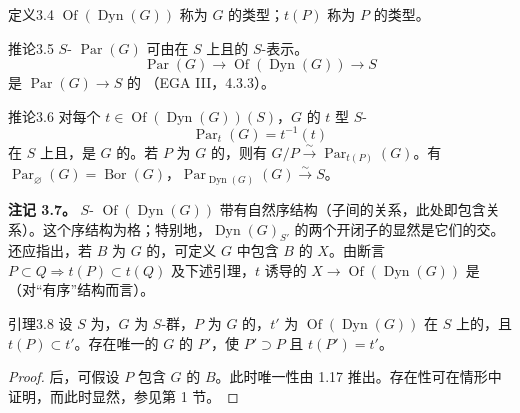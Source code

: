 \begin{SGAresult}{定义}{3.4}
$\operatorname{Of}(\operatorname{Dyn}(G))$ 称为 $G$ 的类型；$t(P)$ 称为 $P$ 的类型。
\end{SGAresult}
\begin{SGAresult}{推论}{3.5}
$S$- $\operatorname{Par}(G)$ 可由在 $S$ 上且的 $S$-表示。
\[\operatorname{Par}(G)\longrightarrow\operatorname{Of}(\operatorname{Dyn}(G))\longrightarrow S\]
是 $\operatorname{Par}(G)\to S$ 的 （EGA III，4.3.3）。
\end{SGAresult}
\begin{SGAresult}{推论}{3.6}
对每个 $t\in\operatorname{Of}(\operatorname{Dyn}(G))(S)$，$G$ 的 $t$ 型 $S$-
\[\operatorname{Par}_t(G)=t^{-1}(t)\]
在 $S$ 上且，是 $G$ 的。若 $P$ 为 $G$ 的，则有 $G/P\xrightarrow{\sim}\operatorname{Par}_{t(P)}(G)$。有 $\operatorname{Par}_\varnothing(G)=\operatorname{Bor}(G)$，$\operatorname{Par}_{\operatorname{Dyn}(G)}(G)\xrightarrow{\sim}S$。
\end{SGAresult}
\textbf{注记 3.7。} $S$- $\operatorname{Of}(\operatorname{Dyn}(G))$ 带有自然序结构（子间的关系，此处即包含关系）。这个序结构为格；特别地，$\operatorname{Dyn}(G)_{S'}$ 的两个开闭子的显然是它们的交。还应指出，若 $B$ 为 $G$ 的，可定义 $G$ 中包含 $B$ 的 $X$。由断言 $P\subset Q\Rightarrow t(P)\subset t(Q)$ 及下述引理，$t$ 诱导的 $X\to\operatorname{Of}(\operatorname{Dyn}(G))$ 是（对“有序”结构而言）。
\begin{SGAresult}{引理}{3.8}
设 $S$ 为，$G$ 为 $S$-群，$P$ 为 $G$ 的，$t'$ 为 $\operatorname{Of}(\operatorname{Dyn}(G))$ 在 $S$ 上的，且 $t(P)\subset t'$。存在唯一的 $G$ 的 $P'$，使 $P'\supset P$ 且 $t(P')=t'$。
\end{SGAresult}
\begin{proof}
后，可假设 $P$ 包含 $G$ 的 $B$。此时唯一性由 1.17 推出。存在性可在情形中证明，而此时显然，参见第 1 节。
\end{proof}
